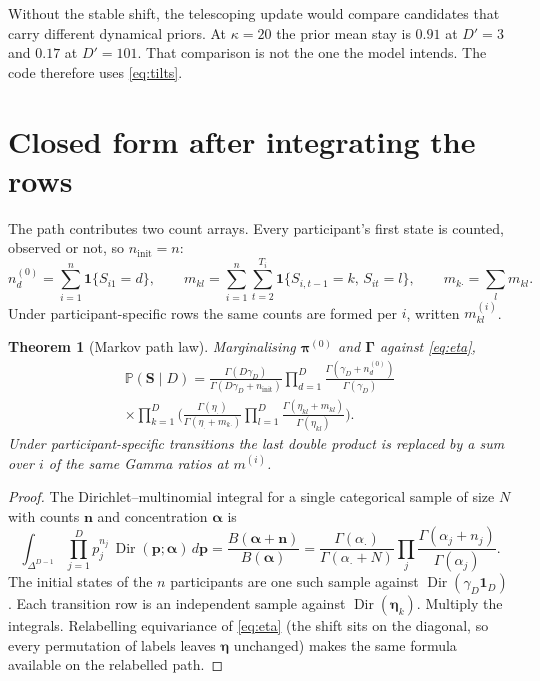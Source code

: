 \documentclass[11pt,a4paper]{article}
\DeclareMathOperator{\Dir}{Dir}
\newcommand{\bs}{\boldsymbol}
\newcommand{\Prb}{\mathbb{P}}
\newcommand{\bGamma}{\boldsymbol{\Gamma}}
\newcommand{\one}{\mathbf{1}}
\newcommand{\gammaD}{\gamma_{D}}
\newcommand{\etadot}{\eta_{\boldsymbol{\cdot}}}
\newcommand{\indic}[1]{\mathbf{1}\{#1\}}
\newcommand{\simplex}{\Delta}
\theoremstyle{plain}
\newtheorem{theorem}{Theorem}
\theoremstyle{definition}
\theoremstyle{remark}
\begin{document}
Without the stable shift, the telescoping update would compare candidates
that carry different dynamical priors. At $\kappa=20$ the prior mean stay
is $0.91$ at $D'=3$ and $0.17$ at $D'=101$. That comparison is not the one
the model intends. The code therefore uses \eqref{eq:tilts}.

\section{Closed form after integrating the rows}

The path contributes two count arrays. Every participant's first state is
counted, observed or not, so $n_{\mathrm{init}}=n$:
\begin{equation}
n^{(0)}_d=\sum_{i=1}^{n}\indic{S_{i1}=d},
\qquad
m_{kl}=\sum_{i=1}^{n}\sum_{t=2}^{T_i}\indic{S_{i,t-1}=k,\,S_{it}=l},
\qquad
m_{k\boldsymbol{\cdot}}=\sum_{l}m_{kl}.
\label{eq:counts}
\end{equation}
Under participant-specific rows the same counts are formed per $i$, written
$m^{(i)}_{kl}$.

\begin{theorem}[Markov path law]
\label{thm:eppf}
Marginalising $\bs\pi^{(0)}$ and $\bGamma$ against \eqref{eq:eta},
\begin{multline}
\Prb(\bs S\mid D)
=
\frac{\Gamma(D\gammaD)}{\Gamma(D\gammaD+n_{\mathrm{init}})}
\prod_{d=1}^{D}\frac{\Gamma(\gammaD+n^{(0)}_d)}{\Gamma(\gammaD)}
\\
\times
\prod_{k=1}^{D}
\Biggl(
\frac{\Gamma(\etadot)}{\Gamma(\etadot+m_{k\boldsymbol{\cdot}})}
\prod_{l=1}^{D}\frac{\Gamma(\eta_{kl}+m_{kl})}{\Gamma(\eta_{kl})}
\Biggr).
\label{eq:eppf}
\end{multline}
Under participant-specific transitions the last double product is replaced
by a sum over $i$ of the same Gamma ratios at $m^{(i)}$.
\end{theorem}

\begin{proof}
The Dirichlet--multinomial integral for a single categorical sample of size
$N$ with counts $\bs n$ and concentration $\bs\alpha$ is
\[
\int_{\simplex^{D-1}}\prod_{j=1}^{D}p_j^{n_j}\,
\Dir(\bs p;\bs\alpha)\,d\bs p
=\frac{B(\bs\alpha+\bs n)}{B(\bs\alpha)}
=\frac{\Gamma(\alpha_{\boldsymbol{\cdot}})}{\Gamma(\alpha_{\boldsymbol{\cdot}}+N)}
\prod_{j}\frac{\Gamma(\alpha_j+n_j)}{\Gamma(\alpha_j)}.
\]
The initial states of the $n$ participants are one such sample against
$\Dir(\gammaD\one_D)$. Each transition row is an independent sample against
$\Dir(\bs\eta_k)$. Multiply the integrals. Relabelling equivariance of
\eqref{eq:eta} (the shift sits on the diagonal, so every permutation of
labels leaves $\bs\eta$ unchanged) makes the same formula available on the
relabelled path.
\end{proof}
\end{document}
